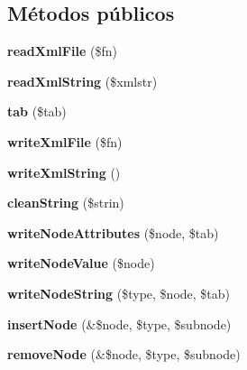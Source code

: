 \subsection*{Métodos públicos}
\begin{DoxyCompactItemize}
\item 
\mbox{\label{classMyXml_a3a5ea00bcb3df045d4139e2a235f8a22}} 
{\bfseries read\+Xml\+File} (\$fn)
\item 
\mbox{\label{classMyXml_af4f787faf6b54c376a570f692c52051d}} 
{\bfseries read\+Xml\+String} (\$xmlstr)
\item 
\mbox{\label{classMyXml_af11dcf960ad0c75397ebf347d879c388}} 
{\bfseries tab} (\$tab)
\item 
\mbox{\label{classMyXml_a055ad33e1423261776210b0676e09ab3}} 
{\bfseries write\+Xml\+File} (\$fn)
\item 
\mbox{\label{classMyXml_a492e0260476d66ca7e2708f50c1c84da}} 
{\bfseries write\+Xml\+String} ()
\item 
\mbox{\label{classMyXml_a276fe0044f6d61474726e3a2751908f8}} 
{\bfseries clean\+String} (\$strin)
\item 
\mbox{\label{classMyXml_afb7ddb2e7374cd53666ecf385e5d5be5}} 
{\bfseries write\+Node\+Attributes} (\$node, \$tab)
\item 
\mbox{\label{classMyXml_a7fc15bbfded7db0bd48351960e5e845d}} 
{\bfseries write\+Node\+Value} (\$node)
\item 
\mbox{\label{classMyXml_a76077b211289f21055bf6b3aecc0c8c8}} 
{\bfseries write\+Node\+String} (\$type, \$node, \$tab)
\item 
\mbox{\label{classMyXml_a5e8568f0e01d562a5e26813b46c31b2f}} 
{\bfseries insert\+Node} (\&\$node, \$type, \$subnode)
\item 
\mbox{\label{classMyXml_ac6bd925dadb3166b08ac5e2cf17c59ef}} 
{\bfseries remove\+Node} (\&\$node, \$type, \$subnode)
\end{DoxyCompactItemize}
